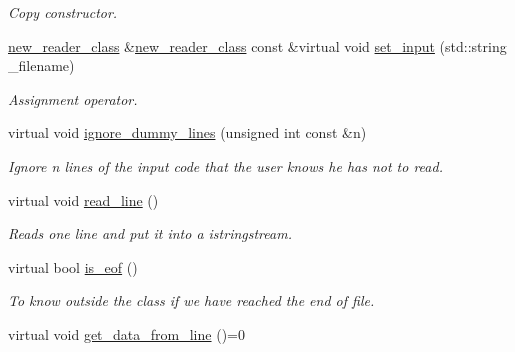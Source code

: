 \begin{DoxyCompactItemize}
\begin{DoxyCompactList}\small\item\em Copy constructor. \item\end{DoxyCompactList}\item 
\hyperlink{classnew__reader__class}{new\_\-reader\_\-class} \&\hyperlink{classnew__reader__class}{new\_\-reader\_\-class} const \&virtual void \hyperlink{classnew__reader__class_a7436b3cd7c184da759e645e446897b12}{set\_\-input} (std::string \_\-filename)
\begin{DoxyCompactList}\small\item\em Assignment operator. \item\end{DoxyCompactList}\item 
virtual void \hyperlink{classnew__reader__class_ae1d2a3f3688c63248728cdee111ff021}{ignore\_\-dummy\_\-lines} (unsigned int const \&n)
\begin{DoxyCompactList}\small\item\em Ignore n lines of the input code that the user knows he has not to read. \item\end{DoxyCompactList}\item 
\hypertarget{classnew__reader__class_a95f6bf521a51258b14e5b5755fe5e75f}{
virtual void \hyperlink{classnew__reader__class_a95f6bf521a51258b14e5b5755fe5e75f}{read\_\-line} ()}
\label{classnew__reader__class_a95f6bf521a51258b14e5b5755fe5e75f}

\begin{DoxyCompactList}\small\item\em Reads one line and put it into a istringstream. \item\end{DoxyCompactList}\item 
\hypertarget{classnew__reader__class_af9e0622ae0a6cd142d659dd9c23f4ed9}{
virtual bool \hyperlink{classnew__reader__class_af9e0622ae0a6cd142d659dd9c23f4ed9}{is\_\-eof} ()}
\label{classnew__reader__class_af9e0622ae0a6cd142d659dd9c23f4ed9}

\begin{DoxyCompactList}\small\item\em To know outside the class if we have reached the end of file. \item\end{DoxyCompactList}\item 
\hypertarget{classnew__reader__class_afca41f4c9ff70f55e93bdb17cd0b365a}{
virtual void \hyperlink{classnew__reader__class_afca41f4c9ff70f55e93bdb17cd0b365a}{get\_\-data\_\-from\_\-line} ()=0}
\label{classnew__reader__class_afca41f4c9ff70f55e93bdb17cd0b365a}


\end{DoxyCompactItemize}
